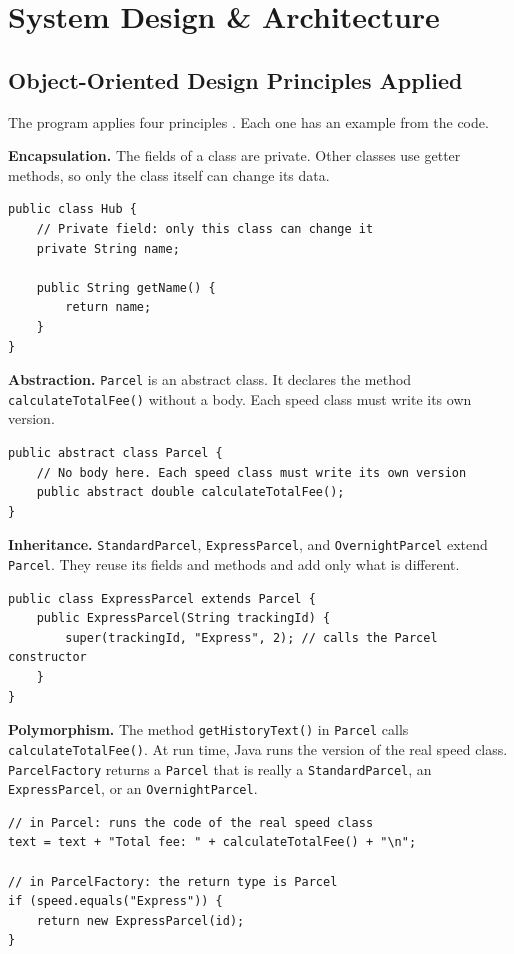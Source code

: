 \chapter{System Design \& Architecture}

\section{Object-Oriented Design Principles Applied}
The program applies four principles \cite{ref1}. Each one has an example from
the code.

\textbf{Encapsulation.} The fields of a class are private. Other classes use
getter methods, so only the class itself can change its data.

\begin{lstlisting}[style=java]
public class Hub {
    // Private field: only this class can change it
    private String name;

    public String getName() {
        return name;
    }
}
\end{lstlisting}

\textbf{Abstraction.} \texttt{Parcel} is an abstract class. It declares the
method \texttt{calculateTotalFee()} without a body. Each speed class must
write its own version.

\begin{lstlisting}[style=java]
public abstract class Parcel {
    // No body here. Each speed class must write its own version
    public abstract double calculateTotalFee();
}
\end{lstlisting}

\textbf{Inheritance.} \texttt{StandardParcel}, \texttt{ExpressParcel}, and
\texttt{OvernightParcel} extend \texttt{Parcel}. They reuse its fields and
methods and add only what is different.

\begin{lstlisting}[style=java]
public class ExpressParcel extends Parcel {
    public ExpressParcel(String trackingId) {
        super(trackingId, "Express", 2); // calls the Parcel constructor
    }
}
\end{lstlisting}

\textbf{Polymorphism.} The method \texttt{getHistoryText()} in \texttt{Parcel}
calls \texttt{calculateTotalFee()}. At run time, Java runs the version of the
real speed class. \texttt{ParcelFactory} returns a \texttt{Parcel} that is
really a \texttt{StandardParcel}, an \texttt{ExpressParcel}, or an
\texttt{OvernightParcel}.

\begin{lstlisting}[style=java]
// in Parcel: runs the code of the real speed class
text = text + "Total fee: " + calculateTotalFee() + "\n";

// in ParcelFactory: the return type is Parcel
if (speed.equals("Express")) {
    return new ExpressParcel(id);
}
\end{lstlisting}

